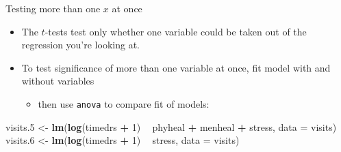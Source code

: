 \documentclass[
  ignorenonframetext,
]{beamer}
\newenvironment{Shaded}{\begin{snugshade}}{\end{snugshade}}
\newcommand{\DataTypeTok}[1]{\textcolor[rgb]{0.13,0.29,0.53}{#1}}
\newcommand{\DecValTok}[1]{\textcolor[rgb]{0.00,0.00,0.81}{#1}}
\newcommand{\FloatTok}[1]{\textcolor[rgb]{0.00,0.00,0.81}{#1}}
\newcommand{\KeywordTok}[1]{\textcolor[rgb]{0.13,0.29,0.53}{\textbf{#1}}}
\newcommand{\NormalTok}[1]{#1}
\newcommand{\OperatorTok}[1]{\textcolor[rgb]{0.81,0.36,0.00}{\textbf{#1}}}
\newcommand{\StringTok}[1]{\textcolor[rgb]{0.31,0.60,0.02}{#1}}
\providecommand{\tightlist}{%
  \setlength{\itemsep}{0pt}\setlength{\parskip}{0pt}}
\begin{document}
\begin{frame}[fragile]{Testing more than one \(x\) at once}
\protect\hypertarget{testing-more-than-one-x-at-once}{}

\begin{itemize}
\tightlist
\item
  The \(t\)-tests test only whether one variable could be taken out of
  the regression you're looking at.
\item
  To test significance of more than one variable at once, fit model with
  and without variables

  \begin{itemize}
  \tightlist
  \item
    then use \texttt{anova} to compare fit of models:
  \end{itemize}
\end{itemize}

\begin{Shaded}
\begin{Highlighting}[]
\NormalTok{visits}\FloatTok{.5}\NormalTok{ <-}\StringTok{ }\KeywordTok{lm}\NormalTok{(}\KeywordTok{log}\NormalTok{(timedrs }\OperatorTok{+}\StringTok{ }\DecValTok{1}\NormalTok{) }\OperatorTok{~}\StringTok{ }\NormalTok{phyheal }\OperatorTok{+}\StringTok{ }\NormalTok{menheal }\OperatorTok{+}\StringTok{ }\NormalTok{stress, }
               \DataTypeTok{data =}\NormalTok{ visits)}
\NormalTok{visits}\FloatTok{.6}\NormalTok{ <-}\StringTok{ }\KeywordTok{lm}\NormalTok{(}\KeywordTok{log}\NormalTok{(timedrs }\OperatorTok{+}\StringTok{ }\DecValTok{1}\NormalTok{) }\OperatorTok{~}\StringTok{ }\NormalTok{stress, }\DataTypeTok{data =}\NormalTok{ visits)}
\end{Highlighting}
\end{Shaded}

\end{frame}
\end{document}
